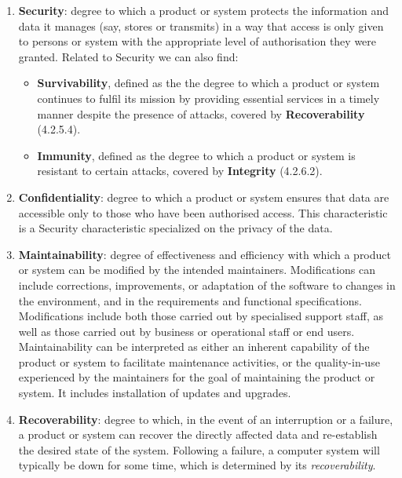 \begin{enumerate}
    \item \textbf{Security}: degree to which a product or system protects the information and data it manages (say, stores or transmits) in a way that access is only given to persons or system with the appropriate level of authorisation they were granted.
    Related to Security we can also find:
    \begin{itemize}
        \item \textbf{Survivability}, defined as the the degree to which a product or system continues to fulfil its mission by providing essential services in a timely manner despite the presence of attacks, covered by \textbf{Recoverability} (4.2.5.4).
        \item \textbf{Immunity}, defined as the degree to which a product or system is resistant to certain attacks, covered by \textbf{Integrity} (4.2.6.2).
    \end{itemize}

    \item \textbf{Confidentiality}: degree to which a product or system ensures that data are accessible only to those who have been authorised access. This characteristic is a Security characteristic specialized on the privacy of the data.

    \item \textbf{Maintainability}: degree of effectiveness and efficiency with which a product or system can be modified by the intended maintainers. Modifications can include corrections, improvements, or adaptation of the software to changes in the environment, and in the requirements and functional specifications. Modifications include both those carried out by specialised support staff, as well as those carried out by business or operational staff or end users. Maintainability can be interpreted as either an inherent capability of the product or system to facilitate maintenance activities, or the quality-in-use experienced by the maintainers for the goal of maintaining the product or system. It includes installation of updates and upgrades. 

    \item \textbf{Recoverability}: degree to which, in the event of an interruption or a failure, a product or system can recover the directly affected data and re-establish the desired state of the system. Following a failure, a computer system will typically be down for some time, which is determined by its \textit{recoverability}.


\end{enumerate}
